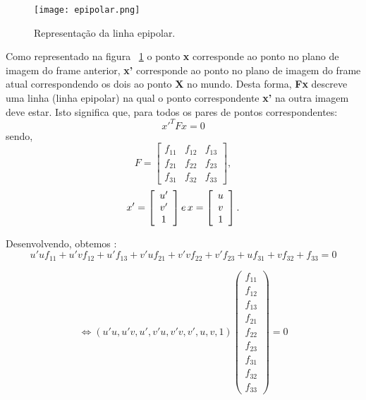 
\begin{figure}[h!] %
	\begin{center}
		\leavevmode		
		\texttt{[image: epipolar.png]}
		\caption{Representação da linha epipolar.}
		\label{fig:equ}
	\end{center}
\end{figure}

Como representado na figura ~\ref{fig:equ} o ponto \textbf{x} corresponde ao ponto no plano de imagem do frame anterior, \textbf{x'} corresponde ao ponto no plano de imagem do frame atual correspondendo os dois ao ponto \textbf{X} no mundo. Desta forma, \textbf{Fx} descreve uma linha (linha epipolar) na qual o ponto correspondente \textbf{x'} na outra imagem deve estar. Isto significa que, para todos os pares de pontos correspondentes: \[ {x}'^{T} F x = 0 \] 
sendo, \[ F =  \left[ \begin{array}{ccc}
f_{11} & f_{12} & f_{13} \\ 
f_{21} & f_{22} & f_{23} \\ 
f_{31} & f_{32} & f_{33} 
\end{array}\right], \] \[ {x}' = \left[ \begin{array}{ccc}
{u}' \\ {v}'\\ 1 
\end{array} \right] e  \thinspace x = \left[ \begin{array}{ccc}
u \\ v \\ 1  \end{array}\right]  . \]

Desenvolvendo, obtemos : \[ u'uf_{11} + u'vf_{12} + u'f_{13} + v'uf_{21} + v'vf_{22} + v'f_{23} + uf_{31} + vf_{32} + f_{33} = 0 \]

\[	\Leftrightarrow (u'u, u'v, u', v'u, v'v, v', u, v, 1) \left( \begin{array}{ccccccccc}
f_{11}\\
f_{12}\\
f_{13}\\
f_{21}\\
f_{22}\\
f_{23}\\
f_{31}\\
f_{32}\\
f_{33}
\end{array} \right) = 0 \] 

